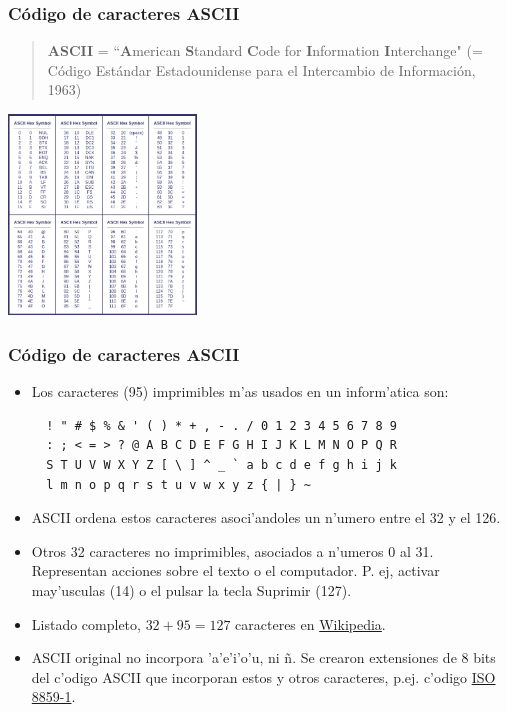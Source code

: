 \documentclass{beamer}
\begin{document}
\begin{frame}[fragile]\frametitle{Código de caracteres ASCII}
\begin{quotation}
\textbf{ASCII}  = ``\textbf{A}merican \textbf{S}tandard \textbf{C}ode for \textbf{I}nformation \textbf{I}nterchange" (= Código Estándar Estadounidense para el Intercambio de Información, 1963)
\end{quotation}
\begin{center}
	\includegraphics[width=5cm]{figs/ascii.png}
\end{center}
\end{frame}


\begin{frame}[fragile]\frametitle{Código de caracteres ASCII}
\begin{itemize}
\item Los caracteres (95) imprimibles m'as usados en un inform'atica son:
\begin{verbatim}
  ! " # $ % & ' ( ) * + , - . / 0 1 2 3 4 5 6 7 8 9 
  : ; < = > ? @ A B C D E F G H I J K L M N O P Q R 
  S T U V W X Y Z [ \ ] ^ _ ` a b c d e f g h i j k 
  l m n o p q r s t u v w x y z { | } ~ 
\end{verbatim}
\item ASCII ordena estos caracteres asoci'andoles un n'umero entre el 32 y el 126. 
\item Otros 32 caracteres no imprimibles, asociados a n'umeros 0 al 31. Representan acciones sobre el texto o el computador. P. ej, activar may'usculas (14) o el pulsar la tecla Suprimir (127). 
\item Listado completo, $32+95 = 127$ caracteres en \href{https://es.wikipedia.org/wiki/ASCII}{Wikipedia}.

\item ASCII original no incorpora 'a'e'i'o'u, ni  \~n. Se crearon extensiones de 8 bits del c'odigo ASCII que incorporan estos y otros caracteres, p.ej. c'odigo \href{https://es.wikipedia.org/wiki/ISO/IEC_8859-1}{ISO 8859-1}.
\end{itemize}
\end{frame}
\end{document}
